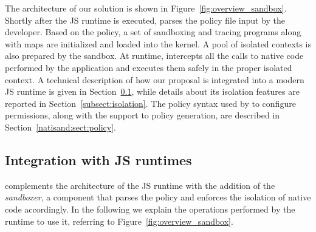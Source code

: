The architecture of our solution is shown in
Figure~\ref{fig:overview_sandbox}. Shortly after the JS runtime is
executed, \natisand parses the policy file input by the developer. Based on
the policy, a set of sandboxing and tracing programs
%
along with maps
%
are initialized and loaded into the kernel. A pool of isolated
contexts is also prepared by the sandbox. At runtime, \natisand intercepts
all the calls to native code performed by the application and executes
them safely in the proper isolated context.
%
A technical description of how our proposal is integrated into a
modern JS runtime is given in Section~\ref{subsect:arch}, while
details about its isolation features are reported in
Section~\ref{subsect:isolation}. The policy syntax used by \natisand to
configure permissions, along with the support to policy
generation, are described in Section~\ref{natisand:sect:policy}.


\subsection{Integration with JS runtimes}
\label{subsect:arch}

\natisand complements the architecture of the JS runtime with the addition
of the {\em sandboxer}, a component that parses the policy and
enforces the isolation of native code accordingly. In the following we
explain the operations performed by the runtime to use it, referring to Figure~\ref{fig:overview_sandbox}.

